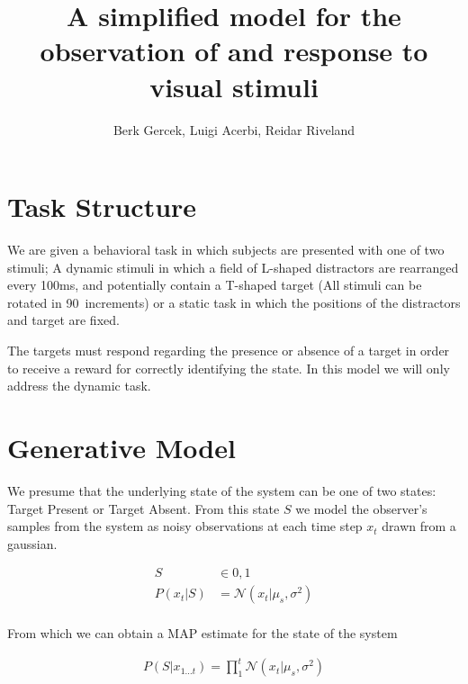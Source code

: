 \documentclass[12pt]{article}
\begin{document}
\title{A simplified model for the observation of and response to visual stimuli}
\author{Berk Gercek, Luigi Acerbi, Reidar Riveland}
\maketitle
\section{Task Structure}
We are given a behavioral task in which subjects are presented with one of two stimuli; A dynamic stimuli in which a field of L-shaped distractors are rearranged every 100ms, and potentially contain a T-shaped target (All stimuli can be rotated in 90\degree \ increments) or a static task in which the positions of the distractors and target are fixed.

The targets must respond regarding the presence or absence of a target in order to receive a reward for correctly identifying the state. In this model we will only address the dynamic task.

\section{Generative Model}
We presume that the underlying state of the system can be one of two states: Target Present or Target Absent. From this state $S$ we model the observer's samples from the system as noisy observations at each time step $x_t$ drawn from a gaussian.

\begin{align*}
S &\in {0, 1} \\
P(x_t | S) &= \mathcal{N}(x_t | \mu_s, \sigma^2)\\
\end{align*} 

From which we can obtain a MAP estimate for the state of the system

\begin{align}
P(S | x_{1 \dots t}) = \prod_1^t \mathcal{N}(x_t | \mu_s, \sigma^2)
\end{align}
\end{document}
